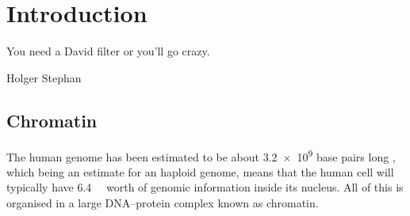 \chapter{Introduction}
\label{ch:intro}

\epigraph{You need a David filter or you'll go crazy.}{Holger Stephan}


\section{Chromatin}

  The human genome has been estimated to be about \num{3.2e9}
  base pairs long \citep{nature-first-human-genome-draft}, which
  being an estimate for an haploid genome, means that the human cell will
  typically have \SI{6.4}{\giga\bp} worth of genomic information inside
  its nucleus.
  All of this is organised in a large DNA--protein complex known as chromatin.

